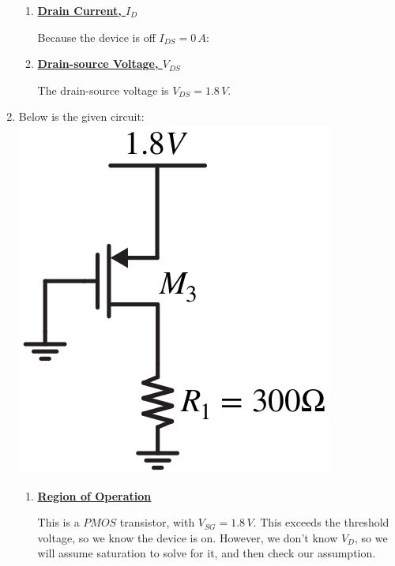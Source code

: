 \documentclass[12pt, fleqn]{article}
\begin{document}
\begin{enumerate}[label=(\alph*)]
{\begin{enumerate}[label=(\roman*)]
{        \vspace{0.25cm}
        $\boxed{\therefore\quad{\text{The device is in \textit{cut-off}.}}}$
        }
        \vspace{0.25cm}
        \item
        {
        \underline{\textbf{Drain Current, $I_D$}}
        
        \vspace{0.15cm}
        Because the device is off $\boxed{I_{DS} = 0\,A}$:
        }
        \vspace{0.25cm}
        \item
        {
        \underline{\textbf{Drain-source Voltage, $V_{DS}$}}
        
        \vspace{0.15cm}
        The drain-source voltage is $\boxed{V_{DS} = 1.8\,V}$.
        }
    \end{enumerate}
    }
    \newpage\noindent
    \item
    {
    Below is the given circuit:\\
    \includegraphics[scale=0.35, center]{p1c.png}\\
    \begin{enumerate}[label=(\roman*)]
        \item
        {
        \underline{\textbf{Region of Operation}}
        
        \vspace{0.15cm}
        This is a $PMOS$ transistor, with $V_{SG} = 1.8\,V$.  This exceeds the threshold voltage, so we know the device is on.  However, we don't know $V_D$, so we will assume saturation to solve for it, and then check our assumption.
        
}
\end{enumerate}}
\end{enumerate}
\end{document}
